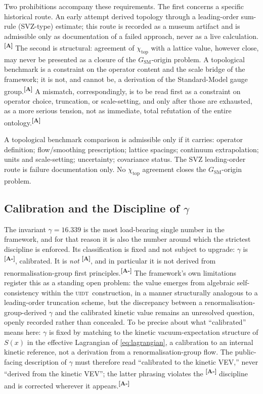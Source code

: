 \documentclass[12pt,a4paper,twoside]{article}
\theoremstyle{plain}
\theoremstyle{definition}
\theoremstyle{remark}
\newcommand{\UIDT}{\textsc{uidt}}
\newcommand{\catmark}[1]{\textsuperscript{\textsf{\textbf{[#1]}}}}
\newcommand{\Sx}{S(x)}
\newcommand{\GammaGeom}{16.339} %
\begin{document}
Two prohibitions accompany these requirements. The first concerns a specific historical route. An early attempt derived topology through a leading-order sum-rule (SVZ-type) estimate; this route is recorded as a museum artifact and is admissible only as documentation of a failed approach, never as a live calculation.\catmark{A} The second is structural: agreement of $\chi_{\mathrm{top}}$ with a lattice value, however close, may never be presented as a closure of the $G_{\mathrm{SM}}$-origin problem. A topological benchmark is a constraint on the operator content and the scale bridge of the framework; it is not, and cannot be, a derivation of the Standard-Model gauge group.\catmark{A} A mismatch, correspondingly, is to be read first as a constraint on operator choice, truncation, or scale-setting, and only after those are exhausted, as a more serious tension, not as immediate, total refutation of the entire ontology.\catmark{A}

\begin{governancebox}
A topological benchmark comparison is admissible only if it carries: operator definition; flow/smoothing prescription; lattice spacings; continuum extrapolation; units and scale-setting; uncertainty; covariance status. The SVZ leading-order route is failure documentation only. No $\chi_{\mathrm{top}}$ agreement closes the $G_{\mathrm{SM}}$-origin problem.
\end{governancebox}

\subsection{Calibration and the Discipline of \texorpdfstring{$\gamma$}{gamma}}
\label{subsec:gamma-discipline}

The invariant $\gamma = \GammaGeom$ is the most load-bearing single number in the framework, and for that reason it is also the number around which the strictest discipline is enforced. Its classification is fixed and not subject to upgrade: $\gamma$ is \catmark{A-}, calibrated. It is \emph{not} \catmark{A}, and in particular it is not derived from renormalisation-group first principles.\catmark{A-} The framework's own limitations register this as a standing open problem: the value emerges from algebraic self-consistency within the \UIDT\ construction, in a manner structurally analogous to a leading-order truncation scheme, but the discrepancy between a renormalisation-group-derived $\gamma$ and the calibrated kinetic value remains an unresolved question, openly recorded rather than concealed. To be precise about what ``calibrated'' means here: $\gamma$ is fixed by matching to the kinetic vacuum-expectation structure of $\Sx$ in the effective Lagrangian of \cref{eq:lagrangian}, a calibration to an internal kinetic reference, not a derivation from a renormalisation-group flow. The public-facing description of $\gamma$ must therefore read ``calibrated to the kinetic VEV,'' never ``derived from the kinetic VEV''; the latter phrasing violates the \catmark{A-} discipline and is corrected wherever it appears.\catmark{A-}
\end{document}
